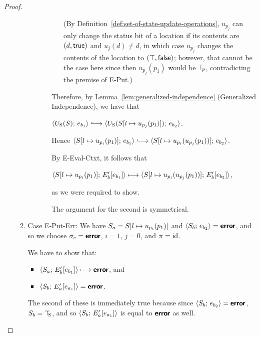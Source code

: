 \begin{proof}
\begin{enumerate}
\begin{enumerate}
\begin{itemize}
\begin{itemize}
\begin{itemize}
            (By Definition~\ref{def:set-of-state-update-operations},
            $u_{p_j}$ can only change the status bit of a location if
            its contents are $(d, \textsf{true})$ and $u_j(d) \neq
            d$, in which case $u_{p_j}$ changes the contents of the
            location to $(\top, \textsf{false})$; however, that
            cannot be the case here since then $u_{p_j}(p_1)$ would be
            $\top\hspace{-0.85mm}_{p}$, contradicting the premise of {\sc E-Put}.)
          \end{itemize}

          Therefore, by Lemma~\ref{lem:generalized-independence}
          (Generalized Independence), we have that

          $\config{\Ustore(S)}{e_{b_1}} \parstepsto
          \config{\Ustore(\extSRaw{S}{l}{u_{p_j}(p_1)})}{e_{b_2}}$.

          Hence $\config{\extSRaw{S}{l}{u_{p_i}(p_1)}}{e_{b_1}}
          \parstepsto
          \config{\extSRaw{S}{l}{u_{p_i}(u_{p_j}(p_1))}}{e_{b_2}}$.

          By {\sc E-Eval-Ctxt}, it follows that

          $\langle S[l \mapsto u_{p_i}(p_1)];\, E'_b\hspace{-0.5mm}\left[e_{b_1}\right] \rangle
          \longmapsto
          \langle S[l \mapsto u_{p_i}(u_{p_j}(p_1))];\, E'_b\hspace{-0.5mm}\left[e_{b_2}\right] \rangle$,

          as we were required to show.

          The argument for the second is symmetrical.

        \end{itemize}

      \end{itemize}

    \item \label{slqc-put-put-err}Case {\sc E-Put-Err}: We have $S_a =
      S[l \mapsto u_{p_i}(p_1)]$ and $\langle S_b;\, e_{b_2} \rangle =
      \textbf{\textsf{error}}$, and so we choose $\sigma_c = \textbf{\textsf{error}}$, $i = 1$, $j = 0$,
      and $\pi = \mathrm{id}$.

      We have to show that:
      \begin{itemize}
      \item $\langle S_a;\, E'_b\hspace{-0.5mm}\left[e_{b_1}\right] \rangle \longmapsto
        \textbf{\textsf{error}}$, and
      \item $\langle S_b;\, E'_a\hspace{-0.5mm}\left[e_{a_1}\right] \rangle = \textbf{\textsf{error}}$.
      \end{itemize}

      The second of these is immediately true because since
      $\langle S_b;\, e_{b_2} \rangle = \textbf{\textsf{error}}$, $S_b = \top\hspace{-0.85mm}_{\mathrm{S}}$, and so
      $\langle S_b;\, E'_a\hspace{-0.5mm}\left[e_{a_1}\right] \rangle$ is equal to $\textbf{\textsf{error}}$ as
      well.


\end{enumerate}
\end{enumerate}
\end{proof}
